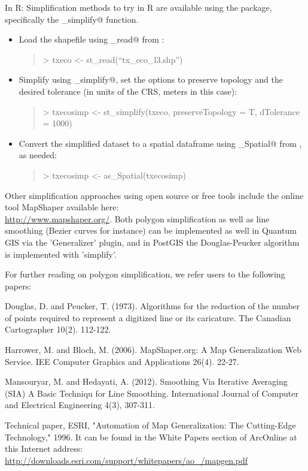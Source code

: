 \documentclass{article}
\begin{document}
In R:
Simplification methods to try in R are available using the \verb@sf@ package, specifically the \verb@st_simplify@ function. 
\begin{itemize}
  \item Load the shapefile using \verb@st_read@ from \verb@sf@:
  \begin{quote}> txeco <- st\_read(``tx\_eco\_l3.shp'')\end{quote}
  \item Simplify using \verb@st_simplify@, set the options to preserve topology and the desired tolerance (in units of the CRS, meters in this case):
  \begin{quote}> txecosimp <- st\_simplify(txeco, preserveTopology = T, dTolerance = 1000)\end{quote}
  \item Convert the simplified dataset to a spatial dataframe using \verb@as_Spatial@ from \verb@sf@, as needed:
  \begin{quote}> txecosimp <- as\_Spatial(txecosimp)\end{quote}
\end{itemize}

Other simplification approaches using  open source or free tools include the online tool MapShaper available here: \\ \url{http://www.mapshaper.org/}. Both polygon simplification as well as line smoothing (Bezier curves for instance)
can be implemented as well in Quantum GIS via the 'Generalizer'  plugin, and in PostGIS the Douglas-Peucker algorithm is implemented with 'simplify'.

For further reading on polygon simplification, we refer users to the following papers:

Douglas, D. and Peucker, T. (1973). Algorithms for the reduction of the number of points required to represent a digitized line or its caricature. The Canadian Cartographer 10(2). 112-122.

Harrower, M. and Bloch, M. (2006). MapShaper.org: A Map Generalization Web Service. IEE Computer Graphics and Applications 26(4). 22-27.

Mansouryar, M. and Hedayati, A. (2012). Smoothing Via Iterative Averaging (SIA) A Basic Techniqu for Line Smoothing. International Journal of Computer and Electrical Engineering 4(3), 307-311.

Technical paper, ESRI, "Automation of Map Generalization: The Cutting-Edge Technology," 1996. It can be found in the White Papers section of ArcOnline at this Internet address: \url{http://downloads.esri.com/support/whitepapers/ao_/mapgen.pdf}
\end{document}

